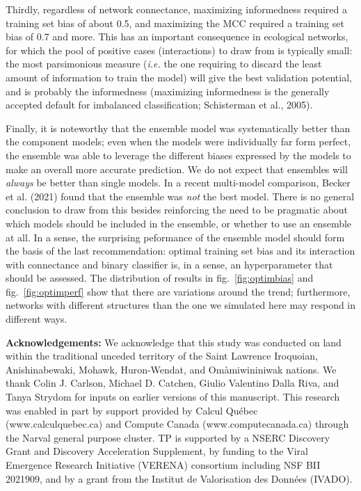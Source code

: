 \documentclass[10pt,oneside]{article}
\begin{document}
Thirdly, regardless of network connectance, maximizing informedness
required a training set bias of about 0.5, and maximizing the MCC
required a training set bias of 0.7 and more. This has an important
consequence in ecological networks, for which the pool of positive cases
(interactions) to draw from is typically small: the most parsimonious
measure (\emph{i.e.} the one requiring to discard the least amount of
information to train the model) will give the best validation potential,
and is probably the informedness (maximizing informedness is the
generally accepted default for imbalanced classification; Schisterman et
al., 2005).

Finally, it is noteworthy that the ensemble model was systematically
better than the component models; even when the models were individually
far form perfect, the ensemble was able to leverage the different biases
expressed by the models to make an overall more accurate prediction. We
do not expect that ensembles will \emph{always} be better than single
models. In a recent multi-model comparison, Becker et al. (2021) found
that the ensemble was \emph{not} the best model. There is no general
conclusion to draw from this besides reinforcing the need to be
pragmatic about which models should be included in the ensemble, or
whether to use an ensemble at all. In a sense, the surprising peformance
of the ensemble model should form the basis of the last recommendation:
optimal training set bias and its interaction with connectance and
binary classifier is, in a sense, an hyperparameter that should be
assessed. The distribution of results in fig.~\ref{fig:optimbias} and
fig.~\ref{fig:optimperf} show that there are variations around the
trend; furthermore, networks with different structures than the one we
simulated here may respond in different ways.

\textbf{Acknowledgements:} We acknowledge that this study was conducted
on land within the traditional unceded territory of the Saint Lawrence
Iroquoian, Anishinabewaki, Mohawk, Huron-Wendat, and Omàmiwininiwak
nations. We thank Colin J. Carlson, Michael D. Catchen, Giulio Valentino
Dalla Riva, and Tanya Strydom for inputs on earlier versions of this
manuscript. This research was enabled in part by support provided by
Calcul Québec (www.calculquebec.ca) and Compute Canada
(www.computecanada.ca) through the Narval general purpose cluster. TP is
supported by a NSERC Discovery Grant and Discovery Acceleration
Supplement, by funding to the Viral Emergence Research Initiative
(VERENA) consortium including NSF BII 2021909, and by a grant from the
Institut de Valorisation des Données (IVADO).
\end{document}
